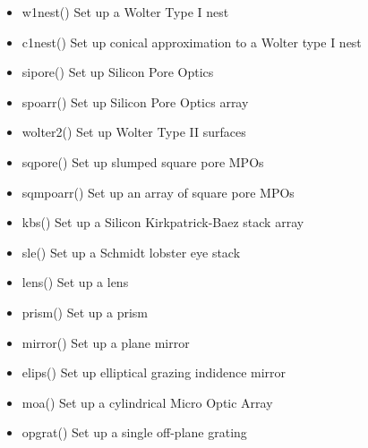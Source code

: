 \documentclass[letterpaper,10pt,english]{sphinxmanual}
\begin{document}
\begin{itemize}
\item {} 
w1nest() Set up a Wolter Type I nest

\item {} 
c1nest() Set up conical approximation to a Wolter type I nest

\item {} 
sipore() Set up Silicon Pore Optics

\item {} 
spoarr() Set up Silicon Pore Optics array

\item {} 
wolter2() Set up Wolter Type II surfaces

\end{itemize}

\begin{itemize}
\item {} 
sqpore() Set up slumped square pore MPOs

\item {} 
sqmpoarr() Set up an array of square pore MPOs

\item {} 
kbs() Set up a Silicon Kirkpatrick-Baez stack array

\item {} 
sle() Set up a Schmidt lobster eye stack

\end{itemize}

\begin{itemize}
\item {} 
lens() Set up a lens

\item {} 
prism() Set up a prism

\item {} 
mirror() Set up a plane mirror

\item {} 
elips() Set up elliptical grazing indidence mirror

\item {} 
moa() Set up a cylindrical Micro Optic Array

\item {} 
opgrat() Set up a single off-plane grating

\end{itemize}
\end{document}
